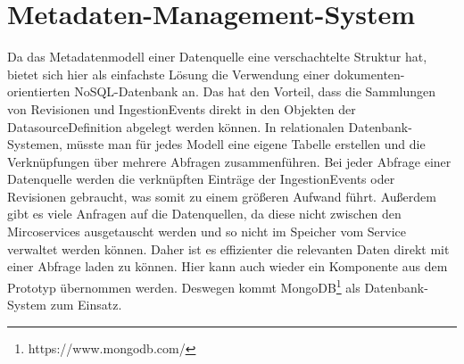\section{Metadaten-Management-System}

Da das Metadatenmodell einer Datenquelle eine verschachtelte Struktur hat, bietet sich hier als einfachste Lösung die Verwendung einer dokumenten-orientierten NoSQL-Datenbank an.
Das hat den Vorteil, dass die Sammlungen von Revisionen und IngestionEvents direkt in den Objekten der DatasourceDefinition abgelegt werden können.
In relationalen Datenbank-Systemen, müsste man für jedes Modell eine eigene Tabelle erstellen und die Verknüpfungen über mehrere Abfragen zusammenführen.
Bei jeder Abfrage einer Datenquelle werden die verknüpften Einträge der IngestionEvents oder Revisionen gebraucht, was somit zu einem größeren Aufwand führt.
Außerdem gibt es viele Anfragen auf die Datenquellen, da diese nicht zwischen den Mircoservices ausgetauscht werden und so nicht im Speicher vom Service verwaltet werden können.
Daher ist es effizienter die relevanten Daten direkt mit einer Abfrage laden zu können.
Hier kann auch wieder ein Komponente aus dem Prototyp übernommen werden.
Deswegen kommt MongoDB\footnote{https://www.mongodb.com/} als Datenbank-System zum Einsatz.
